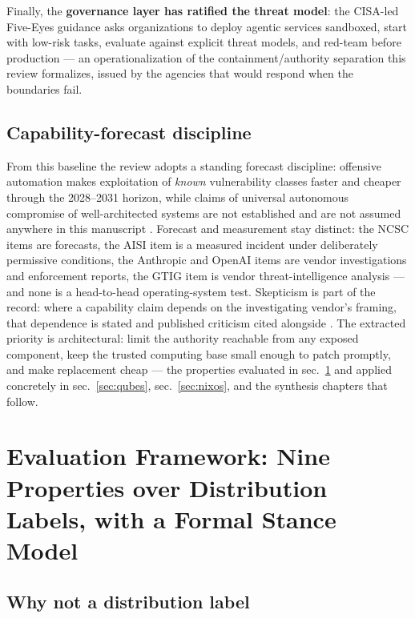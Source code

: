 \documentclass[
  english,
  9pt,
]{extarticle}
\newcounter{none} %
\begin{document}
Finally, the \textbf{governance layer has ratified the threat model}:
the CISA-led Five-Eyes guidance asks organizations to deploy agentic
services sandboxed, start with low-risk tasks, evaluate against explicit
threat models, and red-team before production
\citep{cisa_agentic_guidance} --- an operationalization of the
containment/authority separation this review formalizes, issued by the
agencies that would respond when the boundaries fail.

\subsection{Capability-forecast
discipline}\label{capability-forecast-discipline}

From this baseline the review adopts a standing forecast discipline:
offensive automation makes exploitation of \emph{known} vulnerability
classes faster and cheaper through the 2028--2031 horizon, while claims
of universal autonomous compromise of well-architected systems are not
established and are not assumed anywhere in this manuscript
\citep{ncsc_ai_cyber_threat}. Forecast and measurement stay distinct:
the NCSC items are forecasts, the AISI item is a measured incident under
deliberately permissive conditions, the Anthropic and OpenAI items are
vendor investigations and enforcement reports, the GTIG item is vendor
threat-intelligence analysis --- and none is a head-to-head
operating-system test. Skepticism is part of the record: where a
capability claim depends on the investigating vendor's framing, that
dependence is stated and published criticism cited alongside
\citep{arstechnica_gtg_skepticism}. The extracted priority is
architectural: limit the authority reachable from any exposed component,
keep the trusted computing base small enough to patch promptly, and make
replacement cheap --- the properties evaluated in
sec.~\ref{sec:evaluation_framework} and applied concretely in
sec.~\ref{sec:qubes}, sec.~\ref{sec:nixos}, and the synthesis chapters
that follow.

\newpage

\section{Evaluation Framework: Nine Properties over Distribution Labels,
with a Formal Stance Model}\label{sec:evaluation_framework}

\subsection{Why not a distribution
label}\label{why-not-a-distribution-label}
\end{document}

